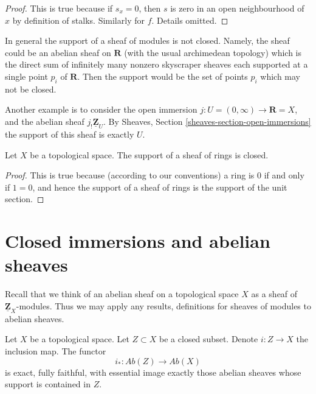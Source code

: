\begin{proof}
This is true because if $s_x = 0$, then $s$ is zero
in an open neighbourhood of $x$ by definition of stalks.
Similarly for $f$. Details omitted.
\end{proof}

\noindent
In general the support of a sheaf of modules is not closed.
Namely, the sheaf could be an abelian sheaf on $\mathbf{R}$
(with the usual archimedean topology)
which is the direct sum of infinitely many nonzero skyscraper
sheaves each supported at a single point $p_i$ of $\mathbf{R}$.
Then the support would be the set of points $p_i$
which may not be closed.

\medskip\noindent
Another example is to consider the open immersion
$j : U = (0 , \infty) \to \mathbf{R} = X$, and the abelian sheaf
$j_!\underline{\mathbf{Z}}_U$. By Sheaves, Section
\ref{sheaves-section-open-immersions} the support of
this sheaf is exactly $U$.

\begin{lemma}
\label{lemma-support-sheaf-rings-closed}
Let $X$ be a topological space.
The support of a sheaf of rings is closed.
\end{lemma}

\begin{proof}
This is true because (according to our conventions)
a ring is $0$ if and only if
$1 = 0$, and hence the support of a sheaf of rings
is the support of the unit section.
\end{proof}






\section{Closed immersions and abelian sheaves}
\label{section-closed-immersions}

\noindent
Recall that we think of an abelian sheaf on a topological space $X$ as a
sheaf of $\underline{\mathbf{Z}}_X$-modules. Thus we may apply any results,
definitions for sheaves of modules to abelian sheaves.

\begin{lemma}
\label{lemma-i-star-exact}
Let $X$ be a topological space. Let $Z \subset X$ be a closed subset.
Denote $i : Z \to X$ the inclusion map. The functor
$$
i_* : \textit{Ab}(Z) \longrightarrow \textit{Ab}(X)
$$
is exact, fully faithful, with essential image exactly those
abelian sheaves whose support is contained in $Z$.
\end{lemma}

